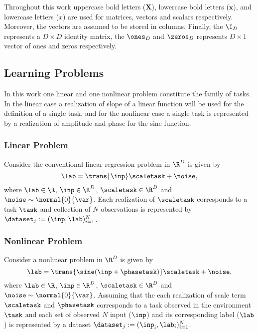 Throughout this work uppercase bold letters (\eg $\mathbf{X}$), lowercase bold letters (\eg $\mathbf{x}$), and lowercase letters (\eg ${x}$) are used for matrices, vectors and scalars respectively. Moreover, the vectors are assumed to be stored in columns. Finally, the $\I_{D}$ represents a $D\times D$ identity matrix, the $\ones_{D}$ and $\zeros_{D}$ represents $D\times 1$ vector of ones and zeros respectively.

\subsection{Learning Problems}

In this work one linear and one nonlinear problem constitute the family of tasks. In the linear case a realization of slope of a linear function will be used for the definition of a single task, and for the nonlinear case a single task is represented by a realization of amplitude and phase for the sine function. 

\subsubsection{Linear Problem}\label{sec:Linear}

Consider the conventional linear regression problem in $\R^D$ is given by
\begin{equation}\label{eq:linearreg}
  \lab = \trans{\inp}\scaletask+\noise, 
\end{equation}
where $\lab\in\R$, $\inp\in\R^D$, $\scaletask\in\R^D$ and $\noise\sim\normal{0}{\var}$. Each realization of $\scaletask$ corresponds to a task $\task$ and collection of $N$ observations is represented by $\dataset_{j}:=(\inp, \lab)_{i=1}^{N}$. 

\subsubsection{Nonlinear Problem}\label{sec:Nonlinear}

Consider a nonlinear problem in $\R^D$ is given by
\begin{equation}\label{eq:nonlinearreg}
  \lab = \trans{\sine(\inp+\phasetask)}\scaletask+\noise, 
\end{equation}
where $\lab\in\R$, $\inp\in\R^D$, $\scaletask\in\R^D$ and $\noise\sim\normal{0}{\var}$. Assuming that the each realization of scale term $\scaletask$ and $\phasetask$ corresponds to a task observed in the environment $\task$ and each set of observed $N$ input ($\inp$) and its corresponding label ($\lab$) is represented by a dataset $\dataset_{j}:=(\inp_i, \lab_i)_{i=1}^{N}$.

